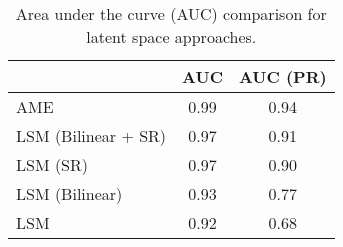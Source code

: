 \begin{table}[ht]
\centering
\begingroup\normalsize
\begin{tabular}{lcc}
  & AUC & AUC (PR) \\ 
  \hline
\hline
AME & 0.99 & 0.94 \\ 
  LSM (Bilinear + SR) & 0.97 & 0.91 \\ 
  LSM (SR) & 0.97 & 0.90 \\ 
  LSM (Bilinear) & 0.93 & 0.77 \\ 
  LSM & 0.92 & 0.68 \\ 
  \end{tabular}
\endgroup
\caption{Area under the curve (AUC) comparison for latent space approaches.} 
\label{tab:aucTable_latSpace}
\end{table}
